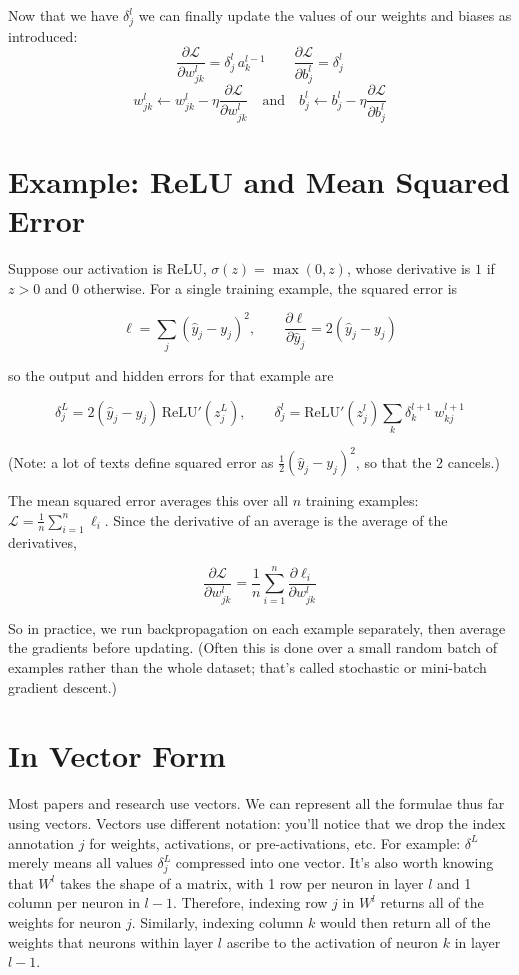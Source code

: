 \documentclass{article}
\begin{document}
Now that we have $\delta^l_j$ we can finally update the values of our weights and biases as introduced:
\[{\frac{\partial \mathcal{L}}{\partial w^l_{jk}} = \delta^l_j \, a^{l-1}_k \qquad \frac{\partial \mathcal{L}}{\partial b^l_j} = \delta^l_j}\]
\[w^{l}_{jk} \leftarrow w^{l}_{jk} - \eta \frac{\partial \mathcal{L}}{\partial w^{l}_{jk}} \quad \text{and} \quad b^l_j \leftarrow b^l_j - \eta \frac{\partial \mathcal{L}}{\partial b^{l}_{j}}\]

\section*{Example: ReLU and Mean Squared Error}
Suppose our activation is ReLU, $\sigma(z) = \max(0, z)$, whose derivative is $1$ if $z > 0$ and $0$ otherwise. For a single training example, the squared error is

\[\ell = \sum_j (\hat{y}_j - y_j)^2, \qquad \frac{\partial \ell}{\partial \hat{y}_j} = 2(\hat{y}_j - y_j)\]

so the output and hidden errors for that example are

\[\delta^L_j = 2(\hat{y}_j - y_j)\,\text{ReLU}'(z^L_j), \qquad \delta^l_j = \text{ReLU}'(z^l_j)\sum_k \delta^{l+1}_k\, w^{l+1}_{kj}\]

(Note: a lot of texts define squared error as $\frac{1}{2}(\hat{y}_j - y_j)^2$, so that the 2 cancels.)

The mean squared error averages this over all $n$ training examples: $\mathcal{L} = \frac{1}{n}\sum_{i=1}^{n} \ell_i$. Since the derivative of an average is the average of the derivatives,

\[\frac{\partial \mathcal{L}}{\partial w^l_{jk}} = \frac{1}{n}\sum_{i=1}^{n} \frac{\partial \ell_i}{\partial w^l_{jk}}\]

So in practice, we run backpropagation on each example separately, then average the gradients before updating. (Often this is done over a small random batch of examples rather than the whole dataset; that's called stochastic or mini-batch gradient descent.)

\section*{In Vector Form}
Most papers and research use vectors. We can represent all the formulae thus far using vectors. Vectors use different notation: you'll notice that we drop the index annotation $j$ for weights, activations, or pre-activations, etc. For example: $\delta^L$ merely means all values $\delta^L_j$ compressed into one vector. It's also worth knowing that $W^l$ takes the shape of a matrix, with 1 row per neuron in layer $l$ and 1 column per neuron in $l - 1$. Therefore, indexing row $j$ in $W^l$ returns all of the weights for neuron $j$. Similarly, indexing column $k$ would then return all of the weights that neurons within layer $l$ ascribe to the activation of neuron $k$ in layer $l - 1$.
\end{document}
